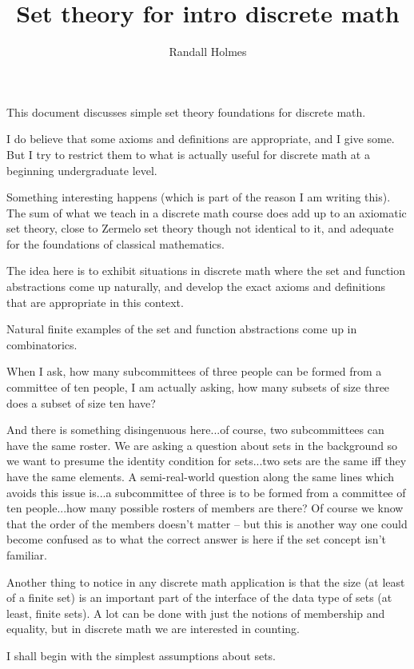 \documentclass[12pt]{article}
\title{Set theory for intro discrete math}
\author{Randall Holmes}
\begin{document}
\maketitle

This document discusses simple set theory foundations for discrete math.

I do believe that some axioms and definitions are appropriate, and I give some.  But I try to restrict them to what is actually useful for discrete math at a beginning undergraduate level.

Something interesting happens (which is part of the reason I am writing this).  The sum of what we teach in a discrete math course does add up to an axiomatic set theory, close to Zermelo set theory though not identical to it, and adequate for the foundations of classical mathematics.

The idea here is to exhibit situations in discrete math where the set and function abstractions come up naturally, and develop the exact axioms and definitions that are appropriate in this context.

Natural finite examples of the set and function abstractions come up in combinatorics.

When I ask, how many subcommittees of three people can be formed from a committee of ten people, I am actually asking, how many subsets of size three does a subset of size ten have?

And there is something disingenuous here...of course, two subcommittees can have the same roster.  We are asking a question about sets in the background so we want to presume the identity condition for sets...two sets are the same iff they have the same elements.   A semi-real-world question along the same lines which avoids this issue is...a subcommittee of three is to be formed from a committee of ten people...how many possible rosters of members are there?  Of course we know that the order of the members doesn't matter -- but this is another way one could become confused as to what the correct answer is here if the set concept isn't familiar.

Another thing to notice in any discrete math application is that the size (at least of a finite set) is an important part of the interface of the data type of sets (at least, finite sets).  A lot can be done with just the notions of membership and equality, but in discrete math we are interested in counting.

I shall begin with the simplest assumptions about sets.
\end{document}
